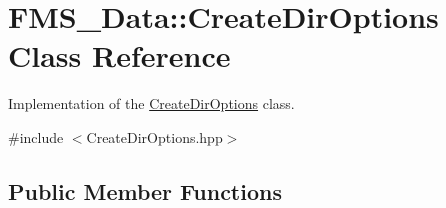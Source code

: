 \hypertarget{classFMS__Data_1_1CreateDirOptions}{
\section{FMS\_\-Data::CreateDirOptions Class Reference}
\label{classFMS__Data_1_1CreateDirOptions}
}


Implementation of the \hyperlink{classFMS__Data_1_1CreateDirOptions}{CreateDirOptions} class.  




{\ttfamily \#include $<$CreateDirOptions.hpp$>$}

\subsection*{Public Member Functions}
